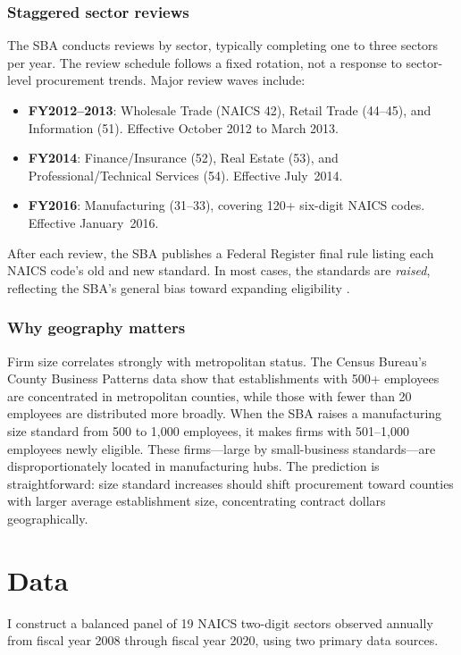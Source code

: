 \documentclass[12pt]{article}
\begin{document}
\subsubsection*{Staggered sector reviews} The SBA conducts reviews by sector, typically completing one to three sectors per year. The review schedule follows a fixed rotation, not a response to sector-level procurement trends. Major review waves include:
\begin{itemize}
  \item \textbf{FY2012--2013}: Wholesale Trade (NAICS 42), Retail Trade (44--45), and Information (51). Effective October 2012 to March 2013.
  \item \textbf{FY2014}: Finance/Insurance (52), Real Estate (53), and Professional/Technical Services (54). Effective July~2014.
  \item \textbf{FY2016}: Manufacturing (31--33), covering 120+ six-digit NAICS codes. Effective January~2016.
\end{itemize}
After each review, the SBA publishes a Federal Register final rule listing each NAICS code's old and new standard. In most cases, the standards are \emph{raised}, reflecting the SBA's general bias toward expanding eligibility \citep{sba2014methodology}.

\subsubsection*{Why geography matters} Firm size correlates strongly with metropolitan status. The Census Bureau's County Business Patterns data show that establishments with 500+ employees are concentrated in metropolitan counties, while those with fewer than 20 employees are distributed more broadly. When the SBA raises a manufacturing size standard from 500 to 1,000 employees, it makes firms with 501--1,000 employees newly eligible. These firms---large by small-business standards---are disproportionately located in manufacturing hubs. The prediction is straightforward: size standard increases should shift procurement toward counties with larger average establishment size, concentrating contract dollars geographically.

\section{Data}

I construct a balanced panel of 19 NAICS two-digit sectors observed annually from fiscal year 2008 through fiscal year 2020, using two primary data sources.
\end{document}
